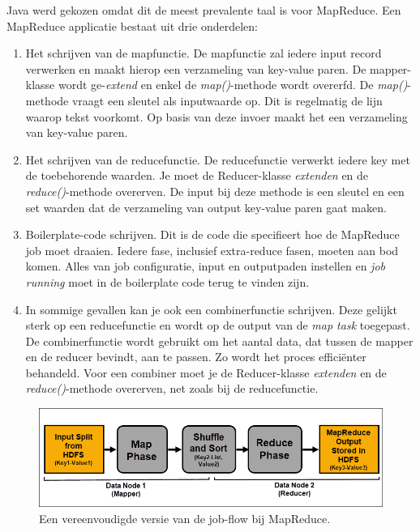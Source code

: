 \documentclass[a4paper,10pt,twoside]{report}
\begin{document}
Java werd gekozen omdat dit de meest prevalente taal is voor MapReduce. Een MapReduce applicatie bestaat uit drie onderdelen:

\begin{enumerate}
	\item Het schrijven van de mapfunctie. De mapfunctie zal iedere input record verwerken en maakt hierop een verzameling van key-value paren. De mapper-klasse wordt ge-\textit{extend} en enkel de \textit{map()}-methode wordt overerfd. De \textit{map()}-methode vraagt een sleutel als inputwaarde op. Dit is regelmatig de lijn waarop tekst voorkomt. Op basis van deze invoer maakt het een verzameling van key-value paren.
	\item Het schrijven van de reducefunctie. De reducefunctie verwerkt iedere key met de toebehorende waarden. Je moet de Reducer-klasse \textit{extenden} en de \textit{reduce()}-methode overerven. De input bij deze methode is een sleutel en een set waarden dat de verzameling van output key-value paren gaat maken.
	\item Boilerplate-code schrijven. Dit is de code die specifieert hoe de MapReduce job moet draaien. Iedere fase, inclusief extra-reduce fasen, moeten aan bod komen. Alles van job configuratie, input en outputpaden instellen en \textit{job running} moet in de boilerplate code terug te vinden zijn. 
	\item In sommige gevallen kan je ook een combinerfunctie schrijven. Deze gelijkt sterk op een reducefunctie en wordt op de output van de \textit{map task} toegepast. De combinerfunctie wordt gebruikt om het aantal data, dat tussen de mapper en de reducer bevindt, aan te passen. Zo wordt het proces efficiënter behandeld. Voor een combiner moet je de Reducer-klasse \textit{extenden} en de \textit{reduce()}-methode overerven, net zoals bij de reducefunctie.
\end{enumerate}

\begin{figure}
	\includegraphics[width=\linewidth]{images/mapper-reducer-mapreduce-job-flow.png}
	\caption{Een vereenvoudigde versie van de job-flow bij MapReduce.}
\end{figure}
\end{document}
